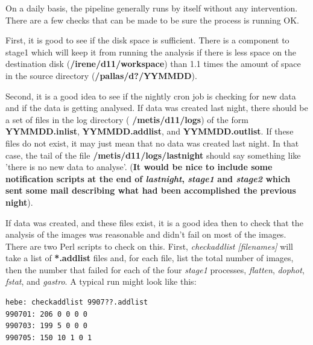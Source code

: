 \documentclass{article}
\newcommand{\note}[1]{({\bf #1})}
\newcommand\pr{\em}                   %
\newcommand\ff{\bf}                   %
\begin{document}
On a daily basis, the pipeline generally runs by itself without any
intervention.  There are a few checks that can be made to be sure the
process is running OK.

First, it is good to see if the disk space is sufficient.  There is a
component to stage1 which will keep it from running the analysis if
there is less space on the destination disk ({\ff /irene/d11/workspace})
than 1.1 times the amount of space in the source directory
({\ff /pallas/d?/YYMMDD}).

Second, it is a good idea to see if the nightly cron job is checking
for new data and if the data is getting analysed.  If data was created
last night, there should be a set of files in the log directory ({\ff
/metis/d11/logs}) of the form {\ff YYMMDD.inlist}, {\ff
YYMMDD.addlist}, and {\ff YYMMDD.outlist}.  If these files do not
exist, it may just mean that no data was created last night.  In that
case, the tail of the file {\ff /metis/d11/logs/lastnight} should say
something like 'there is no new data to analyse'.  \note{It would be
nice to include some notification scripts at the end of {\pr
lastnight}, {\pr stage1} and {\pr stage2} which sent some mail
describing what had been accomplished the previous night}.

If data was created, and these files exist, it is a good idea then to
check that the analysis of the images was reasonable and didn't fail
on most of the images.  There are two Perl scripts to check on this.
First, {\pr checkaddlist [filenames]} will take a list of {\ff
*.addlist} files and, for each file, list the total number of images,
then the number that failed for each of the four {\pr stage1}
processes, {\pr flatten}, {\pr dophot}, {\pr fstat}, and {\pr gastro}.
A typical run might look like this:

\begin{verbatim}
hebe: checkaddlist 9907??.addlist
990701: 206 0 0 0 0
990703: 199 5 0 0 0
990705: 150 10 1 0 1
\end{verbatim}
\end{document}
